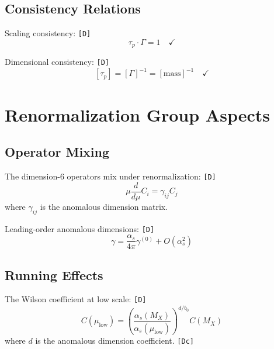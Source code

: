\documentclass[11pt,a4paper]{article}
\newcommand{\tagD}{\textcolor{green!50!black}{\texttt{[D]}}}
\newcommand{\tagDc}{\textcolor{blue!70!black}{\texttt{[Dc]}}}
\theoremstyle{definition}
\begin{document}
\subsection{Consistency Relations}
\label{app:consistency}

Scaling consistency: \tagD{}
\begin{equation}
\label{eq:consistency-1}
\tau_p \cdot \Gamma = 1 \quad \checkmark
\end{equation}

Dimensional consistency: \tagD{}
\begin{equation}
\label{eq:consistency-2}
[\tau_p] = [\Gamma]^{-1} = [\text{mass}]^{-1} \quad \checkmark
\end{equation}

\section{Renormalization Group Aspects}
\label{app:rg}

\subsection{Operator Mixing}
\label{app:mixing}

The dimension-6 operators mix under renormalization: \tagD{}
\begin{equation}
\label{eq:operator-mixing}
\mu \frac{d}{d\mu} C_i = \gamma_{ij} C_j
\end{equation}
where $\gamma_{ij}$ is the anomalous dimension matrix.

Leading-order anomalous dimensions: \tagD{}
\begin{equation}
\label{eq:anomalous-dim}
\gamma = \frac{\alpha_s}{4\pi} \gamma^{(0)} + O(\alpha_s^2)
\end{equation}

\subsection{Running Effects}
\label{app:running-effects}

The Wilson coefficient at low scale: \tagD{}
\begin{equation}
\label{eq:wilson-running}
C(\mu_{\text{low}}) = \left( \frac{\alpha_s(M_X)}{\alpha_s(\mu_{\text{low}})} \right)^{d/b_0} C(M_X)
\end{equation}
where $d$ is the anomalous dimension coefficient. \tagDc{}
\end{document}
